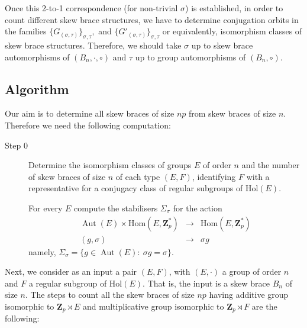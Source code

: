 \documentclass[12pt]{article}
\theoremstyle{definition}
\newcommand{\Z}{\mathbf Z}
\newcommand{\Hol}{\mathrm{Hol}}
\newcommand{\Hom}{\mathrm{Hom}}
\newcommand{\Aut}{\operatorname{Aut}}
\begin{document}
	Once this 2-to-1 correspondence (for non-trivial $\sigma$) is established, in order to count different skew brace structures, we have to determine conjugation orbits in the families
	$
	\{G_{(\sigma,\tau)}\}_{\sigma,\tau},$ and $ \{G'_{(\sigma,\tau)}\}_{\sigma,\tau}
	$
	or equivalently, isomorphism classes of skew brace structures.
	Therefore, we should take $\sigma$ up to skew brace automorphisms of $(B_n,\cdot,\circ)$ and
	$\tau$ up to group automorphisms of $(B_n, \circ)$.
	
	
	\subsection{Algorithm}
	
	Our aim is to determine all skew braces of size $np$ from skew braces of size $n$. Therefore we need the following computation:
	\begin{description}
		\item[Step 0] Determine the isomorphism classes of groups $E$ of order $n$ and the number of skew braces of size $n$ of each type $(E,F)$, identifying $F$ with a representative for a conjugacy class of regular subgroups of $\Hol(E)$.
		
		For every $E$  compute the stabilisers $\Sigma_{\sigma}$ for the action
		$$
		\begin{array}{ccc}
		\Aut(E)\times \Hom(E,\Z_p^*)&\longrightarrow&  \Hom(E,\Z_p^*) \\
		(g, \sigma) &\longrightarrow & \sigma g
		\end{array}
		$$
		namely, $\Sigma_{\sigma}=\{g\in\Aut(E): \  \sigma g=\sigma\}$.
		
	\end{description}
	
	Next, we consider as an input a pair $(E,F)$, with $(E,\cdot)$ a group of order $n$ and $F$ a regular subgroup of $\Hol(E)$. 
    That is, the input is a skew brace $B_n$ of size $n$.  The steps
	to count all the skew braces of size $np$ having additive group isomorphic to $\Z_p\rtimes E$ and multiplicative group isomorphic to $\Z_p\rtimes F$ are the following:
	
\end{document}
